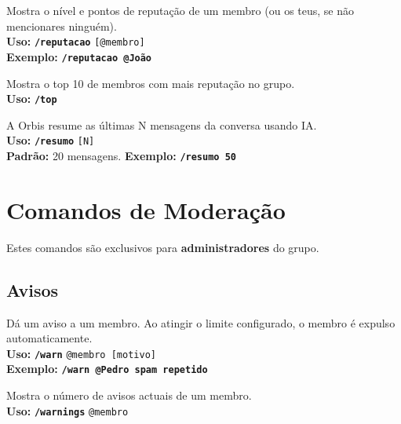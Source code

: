 \documentclass[12pt,a4paper]{article}
\newcommand{\cmd}[1]{\texttt{\textcolor{orbisblue}{\textbf{#1}}}}
\newcommand{\param}[1]{\texttt{\textcolor{orbisMid}{#1}}}
\begin{document}
\begin{tcolorbox}[cmdbox, title={\faStar\ /reputacao}]
Mostra o nível e pontos de reputação de um membro (ou os teus, se não mencionares ninguém).\\
\textbf{Uso:} \cmd{/reputacao} \param{[@membro]}\\
\textbf{Exemplo:} \cmd{/reputacao @João}
\end{tcolorbox}

\begin{tcolorbox}[cmdbox, title={\faTrophy\ /top}]
Mostra o top 10 de membros com mais reputação no grupo.\\
\textbf{Uso:} \cmd{/top}
\end{tcolorbox}

\begin{tcolorbox}[cmdbox, title={\faAlignLeft\ /resumo}]
A Orbis resume as últimas N mensagens da conversa usando IA.\\
\textbf{Uso:} \cmd{/resumo} \param{[N]}\\
\textbf{Padrão:} 20 mensagens. \textbf{Exemplo:} \cmd{/resumo 50}
\end{tcolorbox}


\section{Comandos de Moderação}
\label{sec:moderacao}

Estes comandos são exclusivos para \textbf{administradores} do grupo.

\subsection{Avisos}

\begin{tcolorbox}[cmdbox, title={\faExclamationTriangle\ /warn}]
Dá um aviso a um membro. Ao atingir o limite configurado, o membro é expulso automaticamente.\\
\textbf{Uso:} \cmd{/warn} \param{@membro [motivo]}\\
\textbf{Exemplo:} \cmd{/warn @Pedro spam repetido}
\end{tcolorbox}

\begin{tcolorbox}[cmdbox, title={\faEyeSlash\ /warnings}]
Mostra o número de avisos actuais de um membro.\\
\textbf{Uso:} \cmd{/warnings} \param{@membro}
\end{tcolorbox}
\end{document}
